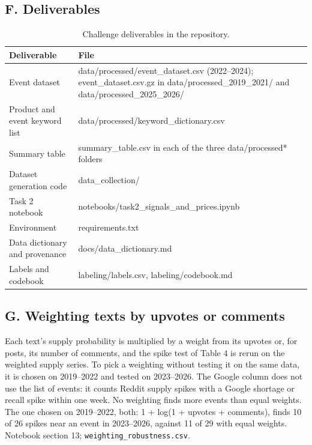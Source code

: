 \documentclass[
  11pt,
]{article}
\begin{document}
\subsection{F. Deliverables}\label{f.-deliverables}

\begin{table}[H]
\centering\small
\caption{Challenge deliverables in the repository.}
\begin{tabularx}{\linewidth}{l>{\RaggedRight\arraybackslash}X}
\toprule
Deliverable & File \\
\midrule
Event dataset & data/processed/event\_dataset.csv (2022--2024); event\_dataset.csv.gz in data/processed\_2019\_2021/ and data/processed\_2025\_2026/ \\
Product and event keyword list & data/processed/keyword\_dictionary.csv \\
Summary table & summary\_table.csv in each of the three data/processed* folders \\
Dataset generation code & data\_collection/ \\
Task 2 notebook & notebooks/task2\_signals\_and\_prices.ipynb \\
Environment & requirements.txt \\
Data dictionary and provenance & docs/data\_dictionary.md \\
Labels and codebook & labeling/labels.csv, labeling/codebook.md \\
\bottomrule
\end{tabularx}
\end{table}

\subsection{G. Weighting texts by upvotes or comments}\label{g.-weighting}

Each text's supply probability is multiplied by a weight from its upvotes or, for posts, its number of comments, and
the spike test of Table 4 is rerun on the weighted supply series. To pick a weighting without testing it on the same
data, it is chosen on 2019--2022 and tested on 2023--2026. The Google column does not use the list of events: it
counts Reddit supply spikes with a Google shortage or recall spike within one week. No weighting finds more events
than equal weights. The one chosen on 2019--2022, both: 1 + log(1 + upvotes + comments), finds 10 of
26 spikes near an event in 2023--2026, against 11 of 29 with
equal weights. Notebook section 13; \texttt{weighting\_robustness.csv}.
\end{document}
